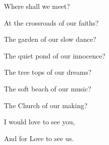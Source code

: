 \documentclass{article}
\begin{document}
\newline

Where shall we meet?
\newline

At the crossroads of our faiths?
\newline

The garden of our slow dance? 
\newline

The quiet pond of our innocence? 
\newline

The tree tops of our dreams? 
\newline

The soft beach of our music? 
\newline

The Church of our making?
\newline

I would love to see you,
\newline

And for Love to see us.
\newline
\end{document}
